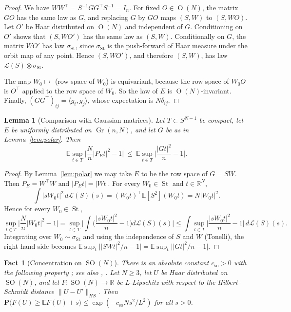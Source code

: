 \documentclass[11pt]{article}
\newtheorem{lemma}[theorem]{Lemma}
\newtheorem{fact}[theorem]{Fact}
\theoremstyle{definition}
\numberwithin{equation}{section}
\newcommand{\R}{\mathbb{R}}
\newcommand{\E}{\mathbb{E}}
\newcommand{\Prob}{\mathbf{P}}
\DeclareMathOperator{\Gr}{Gr}
\DeclareMathOperator{\St}{St}
\DeclareMathOperator{\SO}{SO}
\DeclareMathOperator{\Ort}{O}
\newcommand{\cso}{c_{\mathrm{so}}}
\begin{document}
\begin{proof}
We have $WW^\top=S^{-1}GG^\top S^{-1}=I_n$. For fixed $O\in\Ort(N)$, the matrix $GO$ has the same law as $G$, and replacing $G$ by $GO$ maps $(S,W)$ to $(S,WO)$. Let $O'$ be Haar distributed on $\Ort(N)$ and independent of $G$. Conditioning on $O'$ shows that $(S,WO')$ has the same law as $(S,W)$. Conditionally on $G$, the matrix $WO'$ has law $\sigma_{\St}$, since $\sigma_{\St}$ is the push-forward of Haar measure under the orbit map of any point. Hence $(S,WO')$, and therefore $(S,W)$, has law $\mathcal L(S)\otimes\sigma_{\St}$.

The map $W_0\mapsto$ (row space of $W_0$) is equivariant, because the row space of $W_0O$ is $O^\top$ applied to the row space of $W_0$. So the law of $E$ is $\Ort(N)$-invariant. Finally, $(GG^\top)_{ij}=\langle g_i,g_j\rangle$, whose expectation is $N\delta_{ij}$.
\end{proof}

\begin{lemma}[Comparison with Gaussian matrices]\label{lem:compare}
Let $T\subset S^{N-1}$ be compact, let $E$ be uniformly distributed on $\Gr(n,N)$, and let $G$ be as in Lemma~\ref{lem:polar}. Then
\[
\E\sup_{t\in T}\Big|\frac Nn|P_Et|^2-1\Big|\ \le\ \E\sup_{t\in T}\Big|\frac{|Gt|^2}{n}-1\Big| .
\]
\end{lemma}

\begin{proof}
By Lemma~\ref{lem:polar} we may take $E$ to be the row space of $G=SW$. Then $P_E=W^\top W$ and $|P_Et|=|Wt|$. For every $W_0\in\St$ and $t\in\R^N$,
\[
\int|sW_0t|^2\,d\mathcal L(S)(s)=(W_0t)^\top\E[S^2](W_0t)=N|W_0t|^2 .
\]
Hence for every $W_0\in\St$,
\[
\sup_{t\in T}\Big|\frac Nn|W_0t|^2-1\Big|=\sup_{t\in T}\Big|\int\Big(\frac{|sW_0t|^2}{n}-1\Big)d\mathcal L(S)(s)\Big|\le\int\sup_{t\in T}\Big|\frac{|sW_0t|^2}{n}-1\Big|\,d\mathcal L(S)(s).
\]
Integrating over $W_0\sim\sigma_{\St}$ and using the independence of $S$ and $W$ (Tonelli), the right-hand side becomes $\E\sup_t\big||SWt|^2/n-1\big|=\E\sup_t\big||Gt|^2/n-1\big|$.
\end{proof}

\begin{fact}[Concentration on $\SO(N)$]\label{fact:SO}
There is an absolute constant $\cso>0$ with the following property \cite{GromovMilman}; see also \cite{Ledoux}, \cite[Thm.~5.17]{Meckes}. Let $N\ge3$, let $U$ be Haar distributed on $\SO(N)$, and let $F:\SO(N)\to\R$ be $L$-Lipschitz with respect to the Hilbert--Schmidt distance $\|U-U'\|_{HS}$. Then $\Prob\big(F(U)\ge\E F(U)+s\big)\le\exp(-\cso Ns^2/L^2)$ for all $s>0$.
\end{fact}
\end{document}

